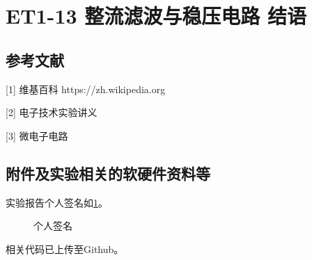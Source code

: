 \documentclass[dvipsnames, svgnames,a4paper,11pt]{article}
\begin{document}
	
	
	
	
	

	
	
	
	
	\clearpage
	
	\section{ET1-13 整流滤波与稳压电路 \quad\heiti 结语}
	
	
	
	\subsection{参考文献}
	[1] 维基百科 https://zh.wikipedia.org
	
	[2] 电子技术实验讲义
	
	[3] 微电子电路
	
	
	\subsection{附件及实验相关的软硬件资料等}
	
	实验报告个人签名如\cref{fig:name}。
	
	\begin{figure}[htbp]
		\centering
		\caption{个人签名}
		\label{fig:name}			
	\end{figure}
	
	
	相关代码已上传至Github。
	
	
	
\end{document}
